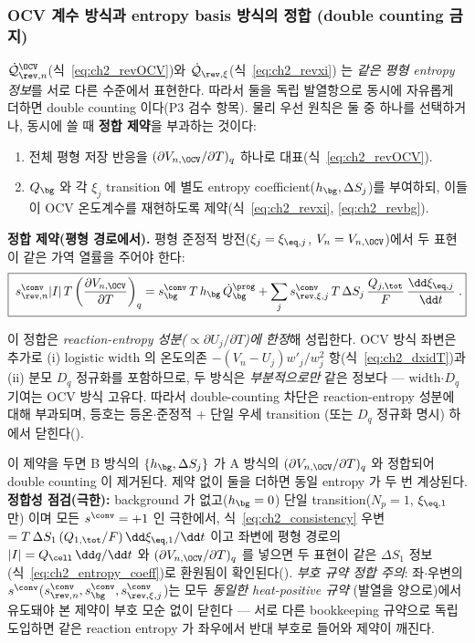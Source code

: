 \subsubsection{OCV 계수 방식과 entropy basis 방식의 정합 (double counting 금지)}\label{sec:ch2_double}
$\dot{\mathcal Q}_{\rev,n}^{\OCV}$(식~\eqref{eq:ch2_revOCV})와 $\dot{\mathcal Q}_{\rev,\xi}$(식~\eqref{eq:ch2_revxi})
는 \emph{같은 평형 entropy 정보}를 서로 다른 수준에서 표현한다. 따라서 둘을 독립 발열항으로 동시에 자유롭게 더하면
double counting 이다(P3 검수 항목). 물리 우선 원칙은 둘 중 하나를 선택하거나, 동시에 쓸 때 \textbf{정합 제약}을
부과하는 것이다:
\begin{enumerate}[label=\Alph*),leftmargin=2.0em]
\item 전체 평형 저장 반응을 $(\partial V_{n,\OCV}/\partial T)_q$ 하나로 대표(식~\eqref{eq:ch2_revOCV}).
\item $Q_\bg$ 와 각 $\xi_j$ transition 에 별도 entropy coefficient($h_\bg,\Delta S_j$)를 부여하되, 이들이
  OCV 온도계수를 재현하도록 제약(식~\eqref{eq:ch2_revxi}, \eqref{eq:ch2_revbg}).
\end{enumerate}
\textbf{정합 제약(평형 경로에서).} 평형 준정적 방전($\xi_j=\xi_{\eq,j}$, $V_n=V_{n,\OCV}$)에서 두 표현이 같은
가역 열률을 주어야 한다:
\begin{equation}
\boxed{\;s_{\rev,n}^{\conv}|I|\,T\left(\frac{\partial V_{n,\OCV}}{\partial T}\right)_q
=s_\bg^{\conv}\,T\,h_\bg\,\dot Q_\bg^{\prog}
+\sum_{j}s_{\rev,\xi,j}^{\conv}\,T\,\Delta S_j\,\frac{Q_{j,\tot}}{F}\,\frac{\dd\xi_{\eq,j}}{\dd t}\;.}
\label{eq:ch2_consistency}
\end{equation}
\begin{boundbox}
이 정합은 \emph{reaction-entropy 성분($\propto\partial U_j/\partial T$)에 한정}해 성립한다. OCV 방식 좌변은 추가로
(i) logistic width 의 온도의존 $-(V_n-U_j)w'_j/w_j^2$ 항(식~\eqref{eq:ch2_dxidT})과 (ii) 분모 $D_q$ 정규화를
포함하므로, 두 방식은 \emph{부분적으로만} 같은 정보다 — width$\cdot D_q$ 기여는 OCV 방식 고유다. 따라서
double-counting 차단은 reaction-entropy 성분에 대해 부과되며, 등호는 등온$\cdot$준정적 + 단일 우세 transition
(또는 $D_q$ 정규화 명시) 하에서 닫힌다().
\end{boundbox}
이 제약을 두면 B 방식의 $\{h_\bg,\Delta S_j\}$ 가 A 방식의 $(\partial V_{n,\OCV}/\partial T)_q$ 와 정합되어
double counting 이 제거된다. 제약 없이 둘을 더하면 동일 entropy 가 두 번 계상된다. \textbf{정합성 점검(극한):}
background 가 없고($h_\bg=0$) 단일 transition($N_p=1$, $\xi_{\eq,1}$ 만) 이며 모든 $s^{\conv}=+1$ 인 극한에서,
식~\eqref{eq:ch2_consistency} 우변 $=T\,\Delta S_1\,(Q_{1,\tot}/F)\,\dd\xi_{\eq,1}/\dd t$ 이고 좌변에 평형
경로의 $|I|=Q_\cell\,\dd q/\dd t$ 와 $(\partial V_{n,\OCV}/\partial T)_q$ 를 넣으면 두 표현이 같은 $\Delta S_1$
정보(식~\eqref{eq:ch2_entropy_coeff})로 환원됨이 확인된다(). \emph{부호 규약 정합 주의}: 좌$\cdot$우변의
$s^{\conv}$($s_{\rev,n}^{\conv},s_\bg^{\conv},s_{\rev,\xi,j}^{\conv}$)는 모두 \emph{동일한 heat-positive 규약}
(발열을 양으로)에서 유도돼야 본 제약이 부호 모순 없이 닫힌다 — 서로 다른 bookkeeping 규약으로 독립 도입하면 같은
reaction entropy 가 좌우에서 반대 부호로 들어와 제약이 깨진다.

